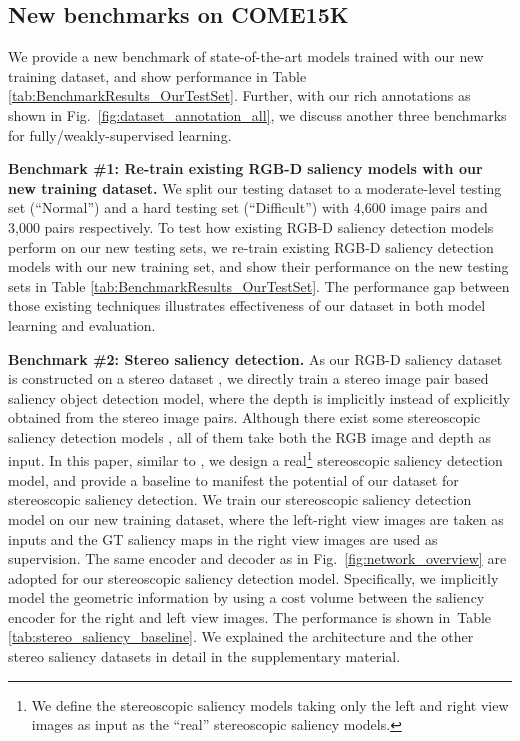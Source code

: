 \documentclass[10pt,twocolumn,letterpaper]{article}
\def\ourdataset{COME15K}
\begin{document}
\subsection{New benchmarks on \ourdataset}
We provide a new benchmark of state-of-the-art models trained with our new training dataset, and show performance in Table \ref{tab:BenchmarkResults_OurTestSet}. Further, with our rich annotations
as shown in Fig.~\ref{fig:dataset_annotation_all}, we discuss another three benchmarks for fully/weakly-supervised learning.




\noindent\textbf{Benchmark \#1: Re-train existing RGB-D saliency models with our new training dataset.}
We split our testing dataset to a moderate-level testing set (\enquote{Normal}) and a hard testing set (\enquote{Difficult}) with 4,600 image pairs and 3,000 pairs respectively.
To test how existing RGB-D saliency detection models perform on our new testing sets, we re-train existing RGB-D saliency detection models with our new training set, and show their performance on the new testing sets in Table \ref{tab:BenchmarkResults_OurTestSet}. The performance gap between those existing techniques illustrates effectiveness of our dataset in both model learning and evaluation.

\noindent\textbf{Benchmark \#2: Stereo saliency detection.}
As our RGB-D saliency dataset is constructed on a stereo dataset \cite{hua2020holopix50k}, we directly train a stereo image pair based saliency object detection model, where the depth is implicitly instead of explicitly obtained from the stereo image pairs.
Although there exist
some stereoscopic saliency detection models \cite{Stereoscopic_Videos_sal,Stereoscopic_depth_confidence,niu2012leveraging,Saliency_stereo}, all of them take both the RGB image and depth as input.
In this paper, similar to \cite{Intrinsic_stereo_video}, we design a real\footnote{We define the stereoscopic saliency models taking only the left and right view images as input as the \enquote{real} stereoscopic saliency models.} stereoscopic saliency detection model, and
provide a baseline
to manifest the potential of our dataset for stereoscopic saliency detection.
We train our stereoscopic saliency detection model on our new training dataset, where the left-right view images are taken as inputs and the GT saliency maps in the right view images are used as supervision. The same encoder and decoder as in Fig.~\ref{fig:network_overview} are adopted for our stereoscopic saliency detection model.
Specifically, we implicitly model the geometric information by using a cost volume between the saliency encoder for the right and left view images. The performance is shown in~Table \ref{tab:stereo_saliency_baseline}. We explained the architecture and the other stereo saliency datasets in detail in the supplementary material.
\end{document}
